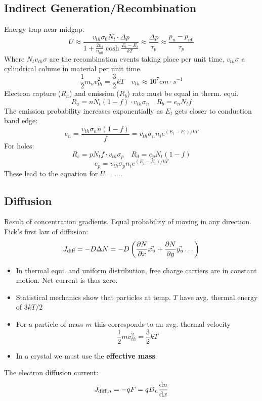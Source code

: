 \documentclass[a4paper, fontsize=8pt, landscape, DIV=1]{scrartcl}
\begin{document}
\begin{multicols*}{4}
  \subsection{Indirect Generation/Recombination}
    Energy trap near midgap.
    \[ U \approx  \frac{v_{th}\sigma_0N_t\cdot\Delta p}{1 + \frac{2n_i}{n_{n0}}\cosh\frac{E_t - E_i}{kT}} \approx \frac{\Delta p}{\tau_p} \approx \frac{p_n - p_{n0}}{\tau_p}\]
    Where $N_tv_{th}\sigma$ are the recombination events taking place per unit time, $v_{th}\sigma$ a cylindrical colume in material per unit time.
    \[\frac{1}{2}m_nv_{th}^2=\frac{3}{2}kT \quad v_{th}\approx 10^7 cm\cdot s^{-1}\]
    Electron capture ($R_a$) and emission ($R_b$) rate must be equal in therm. equi.
    \[R_a = nN_t(1-f)\cdot v_{th}\sigma_n \quad R_b = e_nN_tf\]
    The emission probability increases exponentially as $E_t$ gets closer to conduction band edge:
    \[e_n = \frac{v_{th}\sigma_nn(1-f)}{f}=v_{th}\sigma_nn_ie^{(E_t-E_i)/kT}\]
    For holes:
    \[R_c = pN_tf\cdot v_{th}\sigma_p \quad R_d = e_pN_t(1-f)\]
    \[e_p = v_{th}\sigma_p n_i e^{(E_i-E_t)/kT}\]
    These lead to the equation for $U=\dots$.

  \subsection{Diffusion}
    Result of concentration gradients.
    Equal probability of moving in any direction.
    Fick's first law of diffusion:
    \[J_{\text{diff}} = -D\Delta N = -D \left( \frac{\partial N}{\partial x}\vec{x_u} + \frac{\partial N}{\partial y}\vec{y_u} \dots \right)\]

    \begin{itemize}
      \item In thermal equi. and uniform distribution, free charge carriers are in constant motion. 
      Net current is thus zero.
      \item Statistical mechanics show that particles at temp. $T$ have avg. thermal energy of $3kT/2$
      \item For a particle of mass $m$ this corresponds to an avg. thermal velocity
      \[\frac{1}{2}mv_{th}^2=\frac{3}{2}kT\]
      \item In a crystal we must use the \textbf{effective mass}
    \end{itemize}

    The electron diffusion current:
    \[ J_{\text{diff},n} = -qF = qD_n\frac{\mathrm{d}n}{\mathrm{d}x}\]


\end{multicols*}
\end{document}
